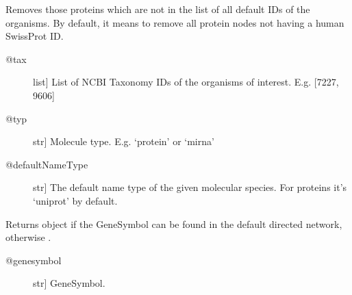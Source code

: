\documentclass[letterpaper,10pt,english]{sphinxmanual}
\begin{document}
\begin{fulllineitems}
\begin{fulllineitems}
\begin{quote}
\begin{description}
\end{description}\end{quote}

\end{fulllineitems}


\begin{fulllineitems}
\label{\detokenize{main:pypath.main.PyPath.delete_unknown}}
Removes those proteins which are not in the list of all default
IDs of the organisms. By default, it means to remove all protein
nodes not having a human SwissProt ID.
\begin{description}
\item[{@tax}] \leavevmode{[}list{]}
List of NCBI Taxonomy IDs of the organisms of interest.
E.g. {[}7227, 9606{]}

\item[{@typ}] \leavevmode{[}str{]}
Molecule type. E.g. ‘protein’ or ‘mirna’

\item[{@defaultNameType}] \leavevmode{[}str{]}
The default name type of the given molecular species.
For proteins it’s ‘uniprot’ by default.

\end{description}

\end{fulllineitems}


\begin{fulllineitems}
\label{\detokenize{main:pypath.main.PyPath.delete_unmapped}}
\end{fulllineitems}


\begin{fulllineitems}
\label{\detokenize{main:pypath.main.PyPath.dgenesymbol}}
Returns  object if the GeneSymbol
can be found in the default directed network,
otherwise .
\begin{description}
\item[{@genesymbol}] \leavevmode{[}str{]}
GeneSymbol.


\end{description}
\end{fulllineitems}
\end{fulllineitems}
\end{document}
